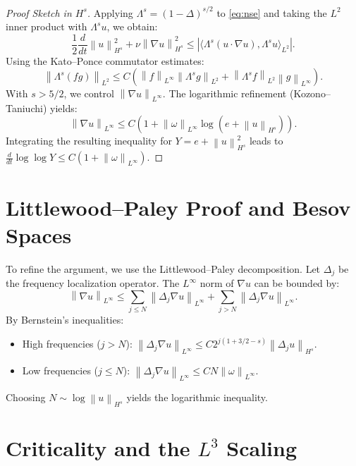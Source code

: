 \documentclass[11pt,a4paper]{amsart}
\newcommand{\norm}[1]{\left\|#1\right\|}
\newcommand{\abs}[1]{\left|#1\right|}
\newcommand{\inner}[2]{\langle #1, #2 \rangle}
\begin{document}
\begin{proof}[Proof Sketch in $H^s$]
Applying $\Lambda^s = (1-\Delta)^{s/2}$ to \eqref{eq:nse} and taking the $L^2$ inner product with $\Lambda^s u$, we obtain:
\begin{equation}
\frac{1}{2} \frac{d}{dt} \norm{u}_{H^s}^2 + \nu \norm{\nabla u}_{H^s}^2 \le \abs{\inner{\Lambda^s(u \cdot \nabla u)}{\Lambda^s u}_{L^2}}.
\end{equation}
Using the Kato--Ponce commutator estimates:
\begin{equation}
\norm{\Lambda^s(fg)}_{L^2} \le C (\norm{f}_{L^\infty} \norm{\Lambda^s g}_{L^2} + \norm{\Lambda^s f}_{L^2} \norm{g}_{L^\infty}).
\end{equation}
With $s > 5/2$, we control $\norm{\nabla u}_{L^\infty}$. The logarithmic refinement (Kozono--Taniuchi) yields:
\begin{equation}
\norm{\nabla u}_{L^\infty} \le C (1 + \norm{\omega}_{L^\infty} \log(e + \norm{u}_{H^s})).
\end{equation}
Integrating the resulting inequality for $Y = e + \norm{u}_{H^s}^2$ leads to $\frac{d}{dt} \log \log Y \le C(1 + \norm{\omega}_{L^\infty})$.
\end{proof}

\section{Littlewood--Paley Proof and Besov Spaces}

To refine the argument, we use the Littlewood--Paley decomposition. Let $\Delta_j$ be the frequency localization operator.
The $L^\infty$ norm of $\nabla u$ can be bounded by:
\begin{equation}
\norm{\nabla u}_{L^\infty} \le \sum_{j \le N} \norm{\Delta_j \nabla u}_{L^\infty} + \sum_{j > N} \norm{\Delta_j \nabla u}_{L^\infty}.
\end{equation}
By Bernstein's inequalities:
\begin{itemize}
 \item High frequencies ($j > N$): $\norm{\Delta_j \nabla u}_{L^\infty} \le C 2^{j(1 + 3/2 - s)} \norm{\Delta_j u}_{H^s}$.
 \item Low frequencies ($j \le N$): $\norm{\Delta_j \nabla u}_{L^\infty} \le C N \norm{\omega}_{L^\infty}$.
\end{itemize}
Choosing $N \sim \log \norm{u}_{H^s}$ yields the logarithmic inequality.

\section{Criticality and the $L^3$ Scaling}
\end{document}
